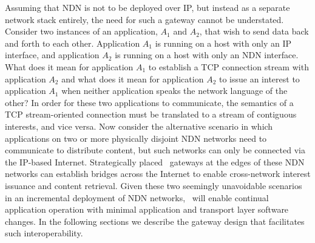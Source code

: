 Assuming that NDN is not to be deployed over IP, but instead as a separate network stack entirely, the need for such a gateway cannot be understated. Consider two instances of an application, $A_1$ and $A_2$, that wish to send data back and forth to each other. Application $A_1$ is running on a host with only an IP interface, and application $A_2$ is running on a host with only an NDN interface. What does it mean for application $A_1$ to establish a TCP connection stream with application $A_2$ and what does it mean for application $A_2$ to issue an interest to application $A_1$ when neither application speaks the network language of the other? In order for these two applications to communicate, the semantics of a TCP stream-oriented connection must be translated to a stream of contiguous interests, and vice versa. Now consider the alternative scenario in which applications on two or more physically disjoint NDN networks need to communicate to distribute content, but such networks can only be connected via the IP-based Internet. Strategically placed \sink\ gateways at the edges of these NDN networks can establish bridges across the Internet to enable cross-network interest issuance and content retrieval. Given these two seemingly unavoidable scenarios in an incremental deployment of NDN networks, \sink\ will enable continual application operation with minimal application and transport layer software changes. In the following sections we describe the gateway design that facilitates such interoperability.




